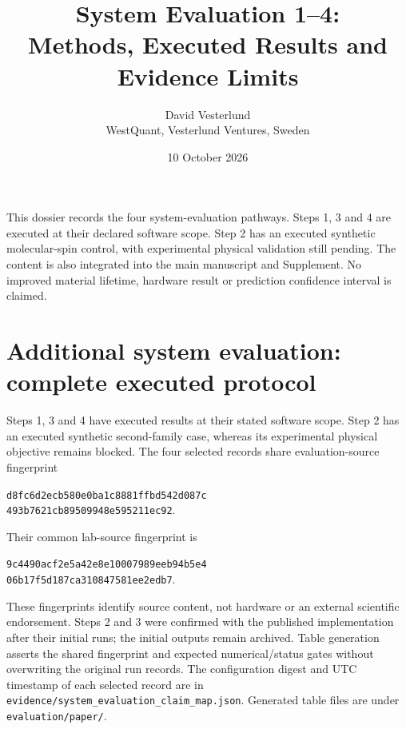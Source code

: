 \documentclass[10pt,a4paper]{article}
\title{System Evaluation 1--4:\\Methods, Executed Results and Evidence Limits}
\author{David Vesterlund\\\small WestQuant, Vesterlund Ventures, Sweden}
\date{10 October 2026}
\newcommand{\code}[1]{\texttt{#1}}
\begin{document}
\maketitle
\noindent This dossier records the four system-evaluation pathways. Steps 1, 3 and 4 are executed at their declared software scope. Step 2 has an executed synthetic molecular-spin control, with experimental physical validation still pending. The content is also integrated into the main manuscript and Supplement. No improved material lifetime, hardware result or prediction confidence interval is claimed.

\section{Additional system evaluation: complete executed protocol}
\label{sec:systemprotocol}
Steps 1, 3 and 4 have executed results at their stated software scope. Step 2 has an executed synthetic second-family case, whereas its experimental physical objective remains blocked. The four selected records share evaluation-source fingerprint
\par\noindent\begin{minipage}{\linewidth}\centering\small\texttt{d8fc6d2ecb580e0ba1c8881ffbd542d087c}\\\texttt{493b7621cb89509948e595211ec92}.\end{minipage}\par
Their common lab-source fingerprint is
\par\noindent\begin{minipage}{\linewidth}\centering\small\texttt{9c4490acf2e5a42e8e10007989eeb94b5e4}\\\texttt{06b17f5d187ca310847581ee2edb7}.\end{minipage}\par
These fingerprints identify source content, not hardware or an external scientific endorsement. Steps 2 and 3 were confirmed with the published implementation after their initial runs; the initial outputs remain archived. Table generation asserts the shared fingerprint and expected numerical/status gates without overwriting the original run records. The configuration digest and UTC timestamp of each selected record are in \code{evidence/system\_evaluation\_claim\_map.json}. Generated table files are under \code{evaluation/paper/}.
\end{document}
